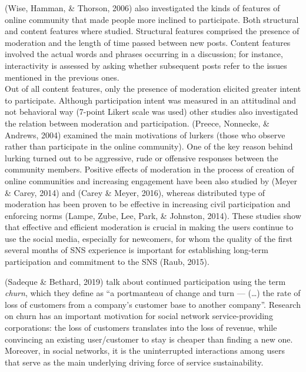 \documentclass[10pt,dvipsnames]{scrartcl}
\begin{document}
(Wise, Hamman, \& Thorson, 2006) also investigated the kinds of features
of online community that made people more inclined to participate. Both
structural and content features where studied. Structural features
comprised the presence of moderation and the length of time passed
between new posts. Content features involved the actual words and
phrases occurring in a discussion; for instance, interactivity is
assessed by asking whether subsequent posts refer to the issues
mentioned in the previous ones.\\
Out of all content features, only the presence of moderation elicited
greater intent to participate. Although participation intent was
measured in an attitudinal and not behavioral way (7-point Likert scale
was used) other studies also investigated the relation between
moderation and participation. (Preece, Nonnecke, \& Andrews, 2004)
examined the main motivations of lurkers (those who observe rather than
participate in the online community). One of the key reason behind
lurking turned out to be aggressive, rude or offensive responses between
the community members. Positive effects of moderation in the process of
creation of online communities and increasing engagement have been also
studied by (Meyer \& Carey, 2014) and (Carey \& Meyer, 2016), whereas
distributed type of moderation has been proven to be effective in
increasing civil participation and enforcing norms (Lampe, Zube, Lee,
Park, \& Johnston, 2014). These studies show that effective and
efficient moderation is crucial in making the users continue to use the
social media, especially for newcomers, for whom the quality of the
first several months of SNS experience is important for establishing
long-term participation and commitment to the SNS (Raub, 2015).

(Sadeque \& Bethard, 2019) talk about continued participation using the
term \textit{churn}, which they define as ``a portmanteau of change and
turn --- (\dots) the rate of loss of customers from a company's customer
base to another company''. Research on churn has an important motivation
for social network service-providing corporations: the loss of customers
translates into the loss of revenue, while convincing an existing
user/customer to stay is cheaper than finding a new one. Moreover, in
social networks, it is the uninterrupted interactions among users that
serve as the main underlying driving force of service sustainability.
\end{document}
